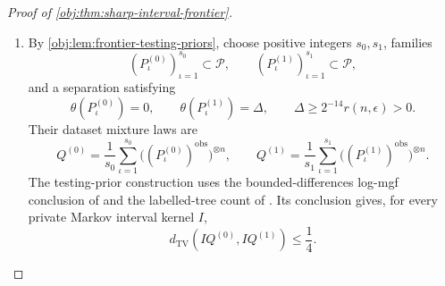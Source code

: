 \documentclass[11pt]{article}
\begin{document}
\begin{proof}[Proof of \cref{obj:thm:sharp-interval-frontier}]
\begin{enumerate}
For every possible value of the joint release in
\cref{obj:def:private-ratio}, define
\[
\mathcal A=nh\min\{1,n\delta\},
\qquad
d_0=\frac{3\mathcal A}{64},
\qquad
B_D=\max\{d_0,\widetilde S_D\},
\qquad
B_N=\operatorname{clip}_{[-B_D,B_D]}(\widetilde S_N),
\qquad
\rho=\sqrt{10V(h,\delta)}.
\]
Because \(n,h,\delta>0\),
\[
\mathcal A>0,
\qquad
B_D\ge d_0>0,
\qquad
\rho\ge0.
\]
Division by the positive \(B_D\) preserves minima and maxima, so
\[
\frac{B_N}{B_D}
=
\frac{\max\{-B_D,\min\{B_D,\widetilde S_N\}\}}{B_D}
=
\max\left\{-1,\min\left\{1,\frac{\widetilde S_N}{B_D}\right\}\right\}
=
\widehat T_{h,k}.
\]
Consequently, the accepted candidate set is
\[
\begin{aligned}
\mathcal V_{\mathrm{acc}}
&=
\left\{\vartheta\in[-1,1]:
|B_N-\vartheta B_D|\le\rho B_D\right\}\\
&=
\left\{\vartheta\in[-1,1]:
\left|\frac{B_N}{B_D}-\vartheta\right|\le\rho\right\}\\
&=
\left[
\max\{-1,\widehat T_{h,k}-\rho\},
\min\{1,\widehat T_{h,k}+\rho\}
\right].
\end{aligned}
\]
Indeed, the absolute-value inequality is equivalent to
\(\widehat T_{h,k}-\rho\le\vartheta\le\widehat T_{h,k}+\rho\).
Moreover,
\[
-1\le\widehat T_{h,k}\le1,
\qquad
\max\{-1,\widehat T_{h,k}-\rho\}
\le\widehat T_{h,k}
\le
\min\{1,\widehat T_{h,k}+\rho\}.
\]
Thus the accepted set is a nonempty closed interval, and its hull has exactly these endpoints. The two constructions apply equal measurable interval maps to the same joint release. Together with the constant branch, this proves
\[
I^*_{n,\epsilon}=\widehat I^*.
\]

\item By \cref{obj:lem:frontier-testing-priors}, choose positive integers \(s_0,s_1\), families
\[
(P^{(0)}_\iota)_{\iota=1}^{s_0}\subset\mathcal P,
\qquad
(P^{(1)}_\iota)_{\iota=1}^{s_1}\subset\mathcal P,
\]
and a separation satisfying
\[
\theta(P^{(0)}_\iota)=0,
\qquad
\theta(P^{(1)}_\iota)=\Delta,
\qquad
\Delta\ge2^{-14}r(n,\epsilon)>0.
\]
Their dataset mixture laws are
\[
Q^{(0)}
=
\frac1{s_0}\sum_{\iota=1}^{s_0}
\bigl((P^{(0)}_\iota)^{\mathrm{obs}}\bigr)^{\otimes n},
\qquad
Q^{(1)}
=
\frac1{s_1}\sum_{\iota=1}^{s_1}
\bigl((P^{(1)}_\iota)^{\mathrm{obs}}\bigr)^{\otimes n}.
\]
The testing-prior construction uses the bounded-differences log-mgf conclusion of
\citep[Theorem 6.2, proof, printed p.~167]{BoucheronLugosiMassart2013}
and the labelled-tree count of
\citep[Section 5.6, Theorem 5.40]{KellerTrotterAppliedCombinatorics}.
Its conclusion gives, for every private Markov interval kernel \(I\),
\[
d_{\mathrm{TV}}(IQ^{(0)},IQ^{(1)})\le\frac14.
\]


\end{enumerate}
\end{proof}
\end{document}

